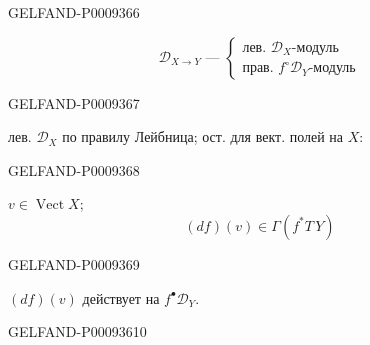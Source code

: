 \begin{GelfandAdjacentEvidence}{GELFAND-P000936}{6}


\begin{equation*}
 \mathcal D_{X\to Y}\text{ --- }
 \left\{\begin{array}{l}
 \text{лев. } \mathcal D_X\text{-модуль}\\
 \text{прав. } f^\circ\mathcal D_Y\text{-модуль}
 \end{array}\right.
 \tag{25}
\end{equation*}
\end{GelfandAdjacentEvidence}
\begin{GelfandAdjacentEvidence}{GELFAND-P000936}{7}


лев. $\mathcal D_X$ по правилу Лейбница; ост. для вект. полей на $X$:
\end{GelfandAdjacentEvidence}
\begin{GelfandAdjacentEvidence}{GELFAND-P000936}{8}


$v\in\operatorname{Vect}X$;
\[
 (df)(v)\in\Gamma(f^*T\,Y)
\]
\end{GelfandAdjacentEvidence}
\begin{GelfandAdjacentEvidence}{GELFAND-P000936}{9}


$(df)(v)$ действует на \underline{\underline{$f^\bullet\mathcal D_Y$}}.
\end{GelfandAdjacentEvidence}
\begin{GelfandAdjacentEvidence}{GELFAND-P000936}{10}

\end{GelfandAdjacentEvidence}


